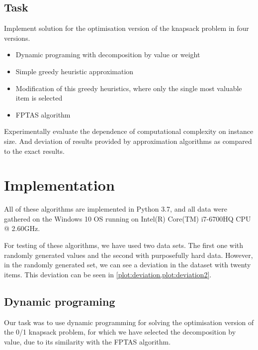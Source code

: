 \subsection{Task}
Implement solution for the optimisation version of the knapsack problem in four versions.

\begin{itemize}
    \item Dynamic programing with decomposition by value or weight
    \item Simple greedy heuristic approximation
    \item Modification of this greedy heuristics, where only the single most valuable item is selected
    \item FPTAS algorithm
\end{itemize}

Experimentally evaluate the dependence of computational complexity on instance size. And deviation of results provided by approximation algorithms as compared to the exact results. 









% 


\section{Implementation}
All of these algorithms are implemented in Python 3.7, and all data were gathered on the Windows 10 OS running on Intel(R) Core(TM) i7-6700HQ CPU @ 2.60GHz.

For testing of these algorithms, we have used two data sets. The first one with randomly generated values and the second with purposefully hard data. However, in the randomly generated set, we can see a deviation in the dataset with twenty items. This deviation can be seen in \cref{plot:deviation,plot:deviation2}.

\subsection{Dynamic programing}
Our task was to use dynamic programming for solving the optimisation version of the 0/1 knapsack problem, for which we have selected the decomposition by value, due to its similarity with the FPTAS algorithm.

